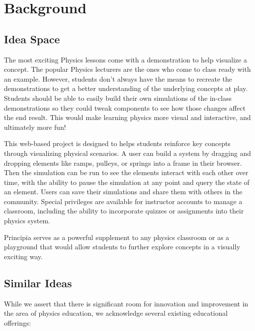 \section{Background}
\iffalse
The background section should be one to three pages long.
\fi

\subsection{Idea Space}
\iffalse
Why is your project needed? What problems does it solve? Who would use it?
\fi

The most exciting Physics lessons come with a demonstration to help visualize a concept. The popular Physics lecturers are the ones who come to class ready with an example. However, students don't always have the means to recreate the demonstrations to get a better understanding of the underlying concepts at play. Students should be able to easily build their own simulations of the in-class demonstrations so they could tweak components to see how those changes affect the end result. This would make learning physics more visual and interactive, and ultimately more fun!

This web-based project is designed to helps students reinforce key concepts through visualizing physical scenarios. A user can build a system by dragging and dropping elements like ramps, pulleys, or springs into a frame in their browser. Then the simulation can be run to see the elements interact with each other over time, with the ability to pause the simulation at any point and query the state of an element. Users can save their simulations and share them with others in the community. Special privileges are available for instructor accounts to manage a classroom, including the ability to incorporate quizzes or assignments into their physics system.

Principia serves as a powerful supplement to any physics classroom or as a playground that would allow students to further explore concepts in a visually exciting way.

\subsection{Similar Ideas}
\iffalse
List and describe other programs that do things like what you want to do. Why is your idea different or better?
\fi

While we assert that there is significant room for innovation and improvement in the area of physics education, we acknowledge several existing educational offerings:

